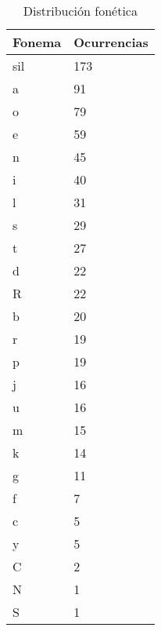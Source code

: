 \begin{table}[H]
\centering
\caption{Distribución fonética}
\label{tab:distribucion_fonetica}
\begin{tabular}{|l|l|}
\textbf{Fonema} & \textbf{Ocurrencias} \\ \hline
sil & 173 \\ \hline
a   & 91  \\ \hline
o   & 79  \\ \hline
e   & 59  \\ \hline
n   & 45  \\ \hline
i   & 40  \\ \hline
l   & 31  \\ \hline
s   & 29  \\ \hline
t   & 27  \\ \hline
d   & 22  \\ \hline
R   & 22  \\ \hline
b   & 20  \\ \hline
r   & 19  \\ \hline
p   & 19  \\ \hline
j   & 16  \\ \hline
u   & 16  \\ \hline
m   & 15  \\ \hline
k   & 14  \\ \hline
g   & 11  \\ \hline
f   & 7   \\ \hline
c   & 5   \\ \hline
y   & 5   \\ \hline
C   & 2   \\ \hline
N   & 1   \\ \hline
S   & 1   \\ \hline
\end{tabular}
\end{table}